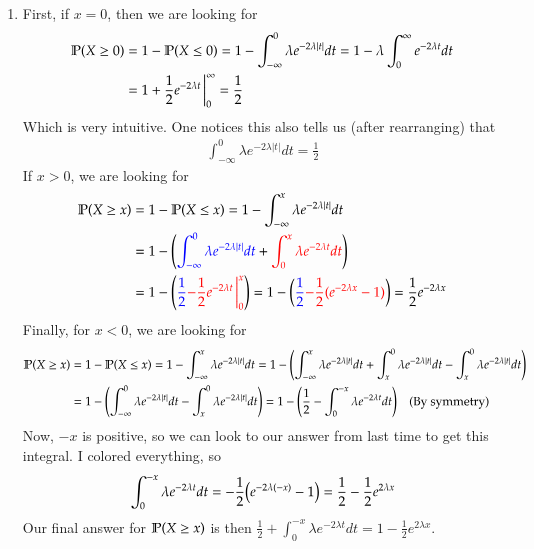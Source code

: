 \documentclass[12pt]{article}
\renewcommand{\P}{\mathbb{P}\qty}
\newcommand{\justif}[1]{\quad \text{(#1)}}
\begin{document}
\begin{enumerate}[leftmargin=\labelsep]
\begin{enumerate}
			\item First, if $x = 0$, then we are looking for 
			\begin{align*}
				\P(X \geq 0) &= 1 - \P(X \leq 0) = 1 - \int_{-\infty}^0 \lambda e^{-2\lambda |t|}dt = 1 - \lambda\int_0^\infty e^{-2\lambda t}dt \\
				&= 1 + \frac12 e^{-2\lambda t}\eval_0^\infty = \frac12
			\end{align*}
			Which is very intuitive. One notices this also tells us (after rearranging) that 
			\begin{align*}
				\int_{-\infty}^0 \lambda e^{-2\lambda |t|}dt = \frac12
			\end{align*}
			If $x > 0$, we are looking for
			\begin{align*}
				\P(X \geq x) &= 1 - \P(X \leq x) = 1 - \int_{-\infty}^x \lambda e^{-2\lambda |t|}dt \\
				&= 1 - \qty(\textcolor{blue}{\int_{-\infty}^0 \lambda e^{-2\lambda |t|}dt} + \textcolor{red}{\int_0^x \lambda e^{-2\lambda t}dt}) \\
				&= 1 - \qty(\textcolor{blue}{\frac12} \textcolor{red}{-\frac12 e^{-2 \lambda t}\eval_0^x}) = 1 - \qty(\textcolor{blue}{\frac12} \textcolor{red}{- \frac12(e^{-2 \lambda x} - 1)}) = \frac12 e^{-2\lambda x}
			\end{align*}
			Finally, for $x < 0$, we are looking for
			\begin{align*}
				\P(X \geq x) &= 1 - \P(X \leq x) = 1 - \int_{-\infty}^x \lambda e^{-2\lambda |t|}dt = 1 - \qty(\int_{-\infty}^x \lambda e^{-2\lambda |t|}dt + \int_x^0 \lambda e^{-2\lambda |t|}dt - \int_x^0 \lambda e^{-2\lambda |t|}dt) \\
				&= 1 - \qty(\int_{-\infty}^0 \lambda e^{-2\lambda |t|}dt - \int_x^0 \lambda e^{-2\lambda |t|}dt) = 1 - \qty(\frac12 - \int_0^{-x} \lambda e^{-2\lambda t}dt) \justif{By symmetry}
			\end{align*}
			Now, $-x$ is positive, so we can look to our answer from last time to get this integral. I colored everything, so 
			\begin{align*}
				\int_0^{-x} \lambda e^{-2\lambda t}dt = -\frac12 \qty(e^{-2\lambda (-x)} - 1) = \frac12 - \frac12 e^{2\lambda x}
			\end{align*}
			Our final answer for $\P(X \geq x)$ is then $\frac12 + \int_0^{-x} \lambda e^{-2\lambda t}dt = 1 - \frac12 e^{2\lambda x}$.
		\end{enumerate}
	

\end{enumerate}
\end{document}
